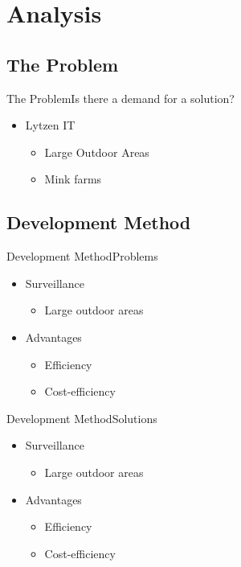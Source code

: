 \author{Bjarke Hesthaven Søndergaard}

\section{Analysis}
\subsection{The Problem}
\begin{frame}{The Problem}{Is there a demand for a solution?}
    \begin{itemize}
        \item Lytzen IT
        \begin{itemize}
            \item Large Outdoor Areas
            \item Mink farms
        \end{itemize}
    \end{itemize}
\end{frame}

\subsection{Development Method}
\begin{frame}{Development Method}{Problems}
    \begin{itemize}
        \item Surveillance
        \begin{itemize}
            \item Large outdoor areas
        \end{itemize}
        \item Advantages
        \begin{itemize}
            \item Efficiency
            \item Cost-efficiency
        \end{itemize}
    \end{itemize}
\end{frame}

\begin{frame}{Development Method}{Solutions}
    \begin{itemize}
        \item Surveillance
        \begin{itemize}
            \item Large outdoor areas
        \end{itemize}
        \item Advantages
        \begin{itemize}
            \item Efficiency
            \item Cost-efficiency
        \end{itemize}
    \end{itemize}
\end{frame}